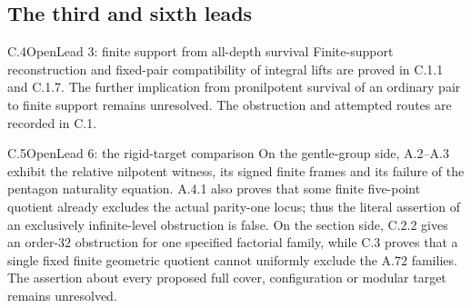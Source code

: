\subsection{The third and sixth leads}

\begin{result}{C.4}{Open}{Lead 3: finite support from all-depth survival}
Finite-support reconstruction and fixed-pair
compatibility of integral lifts are proved in
C.1.1 and C.1.7. The further implication from
pronilpotent survival of an ordinary pair to
finite support remains unresolved. The obstruction
and attempted routes are recorded in C.1.
\end{result}

\begin{result}{C.5}{Open}{Lead 6: the rigid-target comparison}
On the gentle-group side, A.2--A.3 exhibit the
relative nilpotent witness, its signed finite
frames and its failure of the pentagon naturality
equation. A.4.1 also proves that some finite five-point
quotient already excludes the actual parity-one locus;
thus the literal assertion of an exclusively infinite-level
obstruction is false. On the section side, C.2.2 gives an
order-$32$ obstruction for one specified factorial
family, while C.3 proves that a single fixed
finite geometric quotient cannot uniformly
exclude the A.72 families. The assertion about
every proposed full cover, configuration or
modular target remains unresolved.
\end{result}
